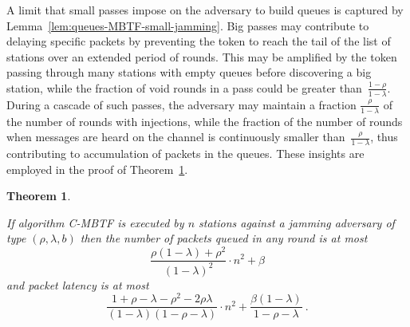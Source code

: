\documentclass[11pt]{article}
\newtheorem{theorem}{Theorem}
\begin{document}
A limit that small passes impose on the adversary to build queues is captured by Lemma~\ref{lem:queues-MBTF-small-jamming}.
Big passes may contribute to delaying specific packets by preventing the token to reach the tail of the list of stations over an extended period of rounds.
This may be amplified by the token passing through many stations with empty queues before discovering a big station, while the fraction of void rounds in a pass could be greater than~$\frac{1-\rho}{1-\lambda}$.
During a cascade of such passes,  the adversary may maintain a fraction $\frac{\rho}{1-\lambda}$ of the number of rounds with injections, while the fraction of the number of rounds when messages are heard on the channel is continuously smaller than~$\frac{\rho}{1-\lambda}$, thus contributing to accumulation of packets in the queues.
These insights are employed in the proof of Theorem~\ref{thm:CMBTF-jamming}.



\begin{theorem}
\label{thm:CMBTF-jamming}

If algorithm  \textsc{C-MBTF} is executed by $n$ stations against a jamming adversary of type $(\rho,\lambda,b)$  then the number of packets queued  in any round is at most 
\begin{equation}
\label{eqn:MBTF-packets-jamming}
\frac{\rho(1-\lambda)+\rho^2 }{(1-\lambda)^2} \cdot n^2 + \beta
\end{equation}
and packet latency is at most
\begin{equation}
\label{eqn:MBTF-latency-jamming}
\frac{1+\rho-\lambda -\rho^2-2\rho\lambda}{(1-\lambda)(1-\rho-\lambda)}  \cdot n^2 + \frac{\beta(1-\lambda)}{1-\rho-\lambda}
\ .
\end{equation}
\end{theorem}
\end{document}
